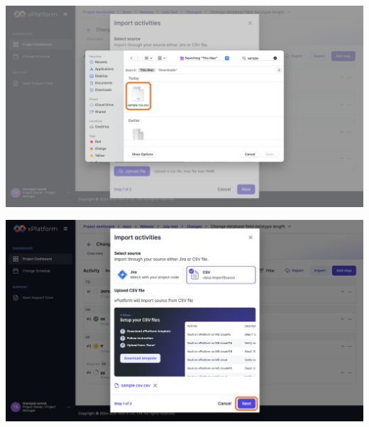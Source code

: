 \begin{center}
    \includegraphics[width=\linewidth]{resources/pages/change-runbook/import-csv/33.png}

    \vspace{1in}

    \includegraphics[width=\linewidth]{resources/pages/change-runbook/import-csv/34.png}
\end{center}
